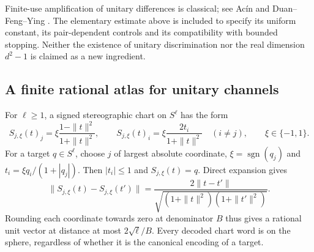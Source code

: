 Finite-use amplification of unitary differences is classical; see
Ac\'in \cite{Acin70} and Duan--Feng--Ying \cite{DFY70}. The elementary
estimate above is included to specify its uniform constant, its
pair-dependent controls and its compatibility with bounded stopping.
Neither the existence of unitary discrimination nor the real dimension
$d^2-1$ is claimed as a new ingredient.

\subsection{A finite rational atlas for unitary channels}
For $\ell\ge1$, a signed stereographic chart on $S^\ell$ has the form
\begin{equation}\label{eq:sphereatlas70}
 S_{j,\xi}(t)_j=\xi\frac{1-\|t\|^2}{1+\|t\|^2},\qquad
 S_{j,\xi}(t)_i=\xi\frac{2t_i}{1+\|t\|^2}\quad(i\ne j),
 \qquad \xi\in\{-1,1\}.
\end{equation}
For a target $q\in S^\ell$, choose $j$ of largest absolute coordinate,
$\xi=\operatorname{sgn}(q_j)$ and
$t_i=\xi q_i/(1+|q_j|)$. Then $|t_i|\le1$ and
$S_{j,\xi}(t)=q$. Direct expansion gives
\begin{equation}\label{eq:stereodistance70}
 \|S_{j,\xi}(t)-S_{j,\xi}(t')\|
 =\frac{2\|t-t'\|}{\sqrt{(1+\|t\|^2)(1+\|t'\|^2)}}.
\end{equation}
Rounding each coordinate towards zero at denominator $B$ thus gives a
rational unit vector at distance at most $2\sqrt\ell/B$. Every decoded
chart word is on the sphere, regardless of whether it is the canonical
encoding of a target.

